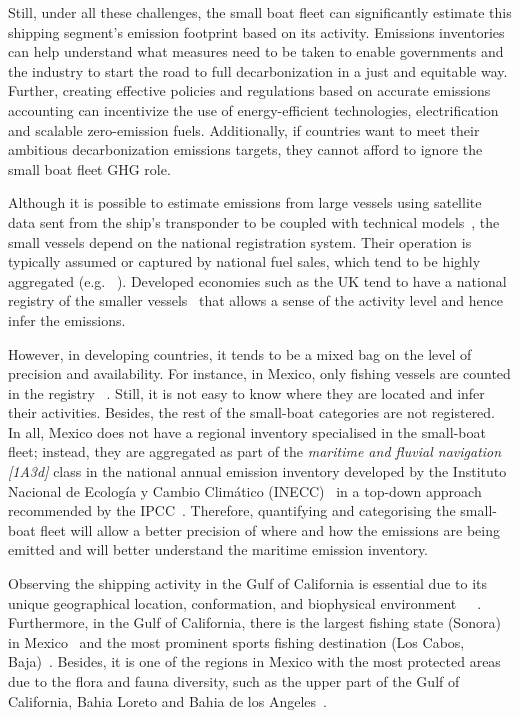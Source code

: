 Still, under all these challenges, the small boat fleet can significantly estimate this shipping segment's emission footprint based on its activity. Emissions inventories can help understand what measures need to be taken to enable governments and the industry to start the road to full decarbonization in a just and equitable way. Further, creating effective policies and regulations based on accurate emissions accounting can incentivize the use of energy-efficient technologies, electrification and scalable zero-emission fuels. Additionally, if countries want to meet their ambitious decarbonization emissions targets, they cannot afford to ignore the small boat fleet GHG role.

Although it is possible to estimate emissions from large vessels using satellite data sent from the ship's transponder to be coupled with technical models~\cite{IMO2021Fourth}, the small vessels depend on the national registration system. Their operation is typically assumed or captured by national fuel sales, which tend to be highly aggregated (e.g. ~\cite{sener2018balance}). Developed economies such as the UK tend to have a national registry of the smaller vessels~\cite{uk2021registration} that allows a sense of the activity level and hence infer the  emissions.

However, in developing countries, it tends to be a mixed bag on the level of precision and availability. For instance, in Mexico, only fishing vessels are counted in the registry ~\cite{Mexico2021RegisteredVessels}. Still, it is not easy to know where they are located and infer their activities. Besides, the rest of the small-boat categories are not registered. In all, Mexico does not have a regional  inventory specialised in the small-boat fleet; instead, they are aggregated as part of the \textit{maritime and fluvial navigation [1A3d]} class in the national annual emission inventory developed by the Instituto Nacional de Ecología y Cambio Climático (INECC)~\cite{inecc2020inventario} in a top-down approach recommended by the IPCC~\cite{eggleston20062006}. Therefore, quantifying and categorising the small-boat fleet will allow a better precision of where and how the emissions are being emitted and will better understand the maritime emission inventory.

Observing the shipping activity in the Gulf of California is essential due to its unique geographical location, conformation, and biophysical environment~\cite{LLUCHCOTA20071}~\cite{munguia2018ecological}~\cite{MARINONE2012133}. Furthermore, in the Gulf of California, there is the largest fishing state (Sonora) in Mexico~\cite{MELTZER2006222} and the most prominent sports fishing destination (Los Cabos, Baja)~\cite{hernandez2012economic}. Besides, it is one of the regions in Mexico with the most protected areas due to the flora and fauna diversity, such as the upper part of the Gulf of California, Bahia Loreto and Bahia de los Angeles~\cite{CNANP2022Atlas, SMARN2022Islas}. 



